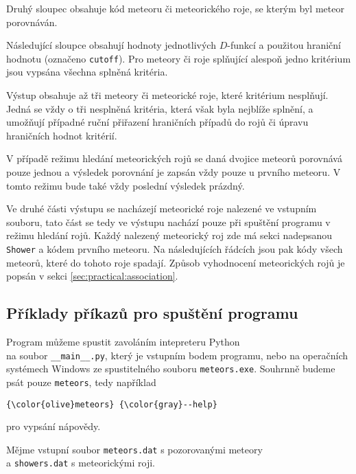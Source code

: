 Druhý sloupec obsahuje kód meteoru či meteorického roje, se kterým byl meteor porovnáván.

Následující sloupce obsahují hodnoty jednotlivých $D$-funkcí a použitou hraniční hodnotu (označeno \texttt{cutoff}). Pro meteory či roje splňující alespoň jedno kritérium jsou vypsána všechna splněná kritéria.

\smallskip

Výstup obsahuje až tři meteory či meteorické roje, které kritérium nesplňují. Jedná se vždy o tři nesplněná kritéria, která však byla nejblíže splnění, a umožňují případné ruční přiřazení hraničních případů do rojů či úpravu hraničních hodnot kritérií.

V případě režimu hledání meteorických rojů se daná dvojice meteorů porovnává pouze jednou a výsledek porovnání je zapsán vždy pouze u prvního meteoru. V tomto režimu bude také vždy poslední výsledek prázdný.

\medskip

Ve druhé části výstupu se nacházejí meteorické roje nalezené ve vstupním souboru, tato část se tedy ve výstupu nachází pouze při spuštění programu v režimu hledání rojů. Každý nalezený meteorický roj zde má sekci nadepsanou \texttt{Shower} a kódem prvního meteoru. Na následujících řádcích jsou pak kódy všech meteorů, které do tohoto roje spadají. Způsob vyhodnocení meteorických rojů je popsán v sekci \ref{sec:practical:association}.

\subsection{Příklady příkazů pro spuštění programu\label{sec:practical:examples}}
Program můžeme spustit zavoláním intepreteru Python \\na soubor \texttt{\_\_main\_\_.py}, který je vstupním bodem programu, nebo na operačních systémech Windows ze spustitelného souboru \texttt{meteors.exe}. Souhrnně budeme psát pouze \texttt{meteors}, tedy například
\begin{Verbatim}[commandchars=\\\{\},gobble=4,formatcom=\small]
    {\color{olive}meteors} {\color{gray}--help}
\end{Verbatim}
pro vypsání nápovědy.

\medskip

Mějme vstupní soubor \texttt{meteors.dat} s pozorovanými meteory \\a \texttt{showers.dat} s meteorickými roji.

